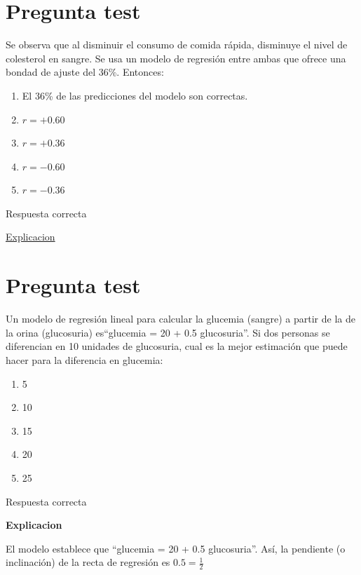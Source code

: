 \documentclass[
]{book}
\providecommand{\tightlist}{%
  \setlength{\itemsep}{0pt}\setlength{\parskip}{0pt}}
\begin{document}
\hypertarget{pregunta-test-133}{%
\section{Pregunta test}\label{pregunta-test-133}}

Se observa que al disminuir el consumo de comida rápida, disminuye el nivel de colesterol en sangre. Se usa un modelo de regresión entre ambas que ofrece una bondad de ajuste del 36\%. Entonces:

\begin{enumerate}
\def\labelenumi{\alph{enumi})}
\tightlist
\item
  El 36\% de las predicciones del modelo son correctas.
\item
  \(r= +0.60\)
\item
  \(r= +0.36\)
\item
  \(r= -0.60\)
\item
  \(r= -0.36\)
\end{enumerate}

Respuesta correcta

\href{https://es.wikipedia.org/wiki/Coeficiente_de_determinación}{Explicacion}

\hypertarget{pregunta-test-134}{%
\section{Pregunta test}\label{pregunta-test-134}}

Un modelo de regresión lineal para calcular la glucemia (sangre) a partir de la de la orina (glucosuria) es``glucemia = 20 + 0.5 glucosuria''. Si dos personas se diferencian en 10 unidades de glucosuria, cual es la mejor estimación que puede hacer para la diferencia en glucemia:

\begin{enumerate}
\def\labelenumi{\alph{enumi})}
\tightlist
\item
  5
\item
  10
\item
  15
\item
  20
\item
  25
\end{enumerate}

Respuesta correcta

\textbf{Explicacion}

El modelo establece que ``glucemia = 20 + 0.5 glucosuria''. Así, la pendiente (o inclinación) de la recta de regresión es \(0.5 = \frac{1}{2}\)
\end{document}
